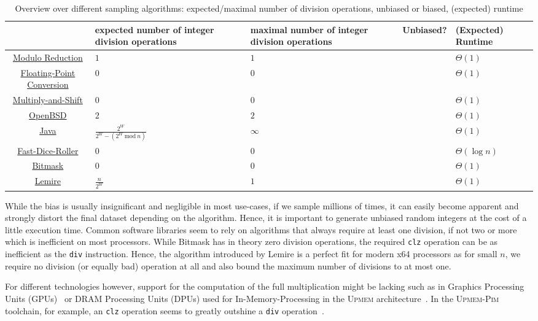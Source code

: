 \documentclass[a4paper, UKenglish, cleveref, autoref, thm-restate]{lipics-v2021}
\newcommand{\Mod}[1]{\ \mathrm{mod}\ #1}
\newcommand{\cmark}{\ding{51}}
\newcommand{\xmark}{\ding{55}}
\begin{document}
\begin{table}[!htb]
    \centering
    \begin{tabular}{c|P{25mm}P{25mm}P{15mm}P{15mm}}
        \toprule
        & expected number of integer division operations & maximal number of integer division operations & Unbiased? & (Expected) Runtime \\
        \midrule
        \hyperref[sec:2.1.1]{Modulo Reduction} & $1$ & $1$ & \xmark & $\Theta(1)$ \\
        \hyperref[sec:2.1.2]{Floating-Point Conversion} & $0$ & $0$ & \xmark & $\Theta(1)$ \\
        \hyperref[sec:2.1.3]{Multiply-and-Shift} & $0$ & $0$ & \xmark & $\Theta(1)$ \\
        \hyperref[sec:2.2.1]{OpenBSD} & $2$ & $2$ & \cmark & $\Theta(1)$ \\
        \hyperref[sec:2.2.2]{Java} & $\frac{2^W}{2^W - (2^W \Mod n)}$ & $\infty$ & \cmark & $\Theta(1)$ \\
        \hyperref[sec:2.2.3]{Fast-Dice-Roller} & $0$ & $0$ & \cmark & $\Theta(\log n)$ \\
        \hyperref[sec:2.2.4]{Bitmask} & $0$ & $0$ & \cmark & $\Theta(1)$ \\
        \hyperref[sec:3]{Lemire} & $\frac{n}{2^W}$ & $1$ & \cmark & $\Theta(1)$ \\
        \bottomrule
    \end{tabular}
    \caption{
        Overview over different sampling algorithms: expected/maximal number of division operations, unbiased or biased, (expected) runtime
    }
    \label{tab:1}
\end{table}

While the bias is usually insignificant and negligible in most use-cases, if we sample millions of times, it can easily become apparent and strongly distort the final dataset depending on the algorithm.
Hence, it is important to generate unbiased random integers at the cost of a little execution time.
Common software libraries seem to rely on algorithms that always require at least one division, if not two or more which is inefficient on most processors.
While Bitmask has in theory zero division operations, the required \texttt{clz} operation can be as inefficient as the \texttt{div} instruction.
Hence, the algorithm introduced by Lemire is a perfect fit for modern x64 processors as for small $n$, we require no division (or equally bad) operation at all and also bound the maximum number of divisions to at most one.

For different technologies however, support for the computation of the full multiplication might be lacking such as in Graphics Processing Units (GPUs)~\cite{GPU} or DRAM Processing Units (DPUs) used for In-Memory-Processing in the \textsc{Upmem} architecture~\cite{Upmem, UpmemSDK}.
In the \textsc{Upmem-Pim} toolchain, for example, an \texttt{clz} operation seems to greatly outshine a \texttt{div} operation~\cite{UpmemRng}.






\end{document}
